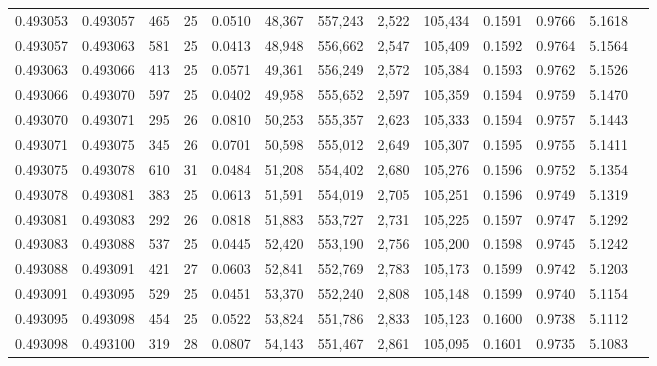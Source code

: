 \begin{tabular}{rrrrrrrrrrrrr}
0.493053 & 0.493057 & 465 &  25 &                                     0.0510 &  48,367 & 557,243 &   2,522 & 105,434 & 0.1591 & 0.9766 & 5.1618 \\
0.493057 & 0.493063 & 581 &  25 &                                     0.0413 &  48,948 & 556,662 &   2,547 & 105,409 & 0.1592 & 0.9764 & 5.1564 \\
0.493063 & 0.493066 & 413 &  25 &                                     0.0571 &  49,361 & 556,249 &   2,572 & 105,384 & 0.1593 & 0.9762 & 5.1526 \\
0.493066 & 0.493070 & 597 &  25 &                                     0.0402 &  49,958 & 555,652 &   2,597 & 105,359 & 0.1594 & 0.9759 & 5.1470 \\
0.493070 & 0.493071 & 295 &  26 &                                     0.0810 &  50,253 & 555,357 &   2,623 & 105,333 & 0.1594 & 0.9757 & 5.1443 \\
0.493071 & 0.493075 & 345 &  26 &                                     0.0701 &  50,598 & 555,012 &   2,649 & 105,307 & 0.1595 & 0.9755 & 5.1411 \\
0.493075 & 0.493078 & 610 &  31 &                                     0.0484 &  51,208 & 554,402 &   2,680 & 105,276 & 0.1596 & 0.9752 & 5.1354 \\
0.493078 & 0.493081 & 383 &  25 &                                     0.0613 &  51,591 & 554,019 &   2,705 & 105,251 & 0.1596 & 0.9749 & 5.1319 \\
0.493081 & 0.493083 & 292 &  26 &                                     0.0818 &  51,883 & 553,727 &   2,731 & 105,225 & 0.1597 & 0.9747 & 5.1292 \\
0.493083 & 0.493088 & 537 &  25 &                                     0.0445 &  52,420 & 553,190 &   2,756 & 105,200 & 0.1598 & 0.9745 & 5.1242 \\
0.493088 & 0.493091 & 421 &  27 &                                     0.0603 &  52,841 & 552,769 &   2,783 & 105,173 & 0.1599 & 0.9742 & 5.1203 \\
0.493091 & 0.493095 & 529 &  25 &                                     0.0451 &  53,370 & 552,240 &   2,808 & 105,148 & 0.1599 & 0.9740 & 5.1154 \\
0.493095 & 0.493098 & 454 &  25 &                                     0.0522 &  53,824 & 551,786 &   2,833 & 105,123 & 0.1600 & 0.9738 & 5.1112 \\
0.493098 & 0.493100 & 319 &  28 &                                     0.0807 &  54,143 & 551,467 &   2,861 & 105,095 & 0.1601 & 0.9735 & 5.1083 \\

\end{tabular}
